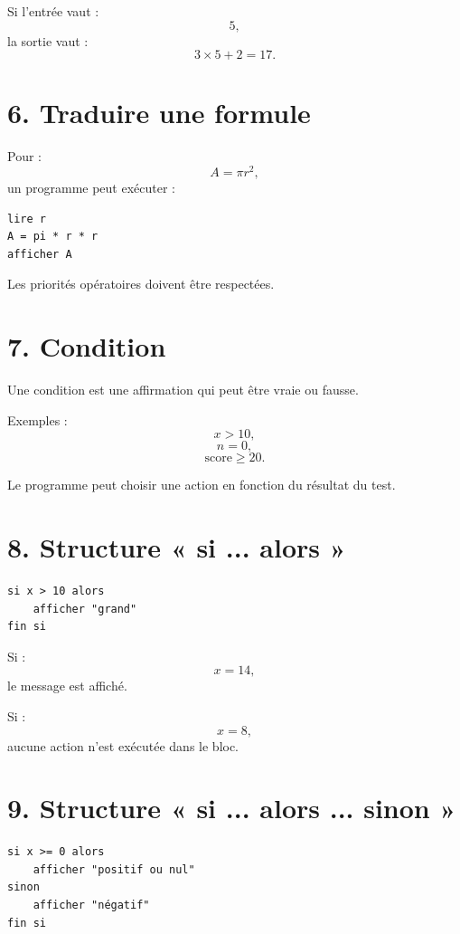 Si l'entrée vaut :
\[
5,
\]
la sortie vaut :
\[
3\times5+2=17.
\]

\section{6. Traduire une formule}

Pour :
\[
A=\pi r^2,
\]
un programme peut exécuter :
\begin{verbatim}
lire r
A = pi * r * r
afficher A
\end{verbatim}

Les priorités opératoires doivent être respectées.

\section{7. Condition}

Une condition est une affirmation qui peut être vraie ou fausse.

Exemples :
\[
x>10,
\]
\[
n=0,
\]
\[
\text{score}\ge20.
\]

Le programme peut choisir une action en fonction du résultat du test.


\section{8. Structure « si ... alors »}

\begin{verbatim}
si x > 10 alors
    afficher "grand"
fin si
\end{verbatim}

Si :
\[
x=14,
\]
le message est affiché.

Si :
\[
x=8,
\]
aucune action n'est exécutée dans le bloc.

\section{9. Structure « si ... alors ... sinon »}

\begin{verbatim}
si x >= 0 alors
    afficher "positif ou nul"
sinon
    afficher "négatif"
fin si
\end{verbatim}


